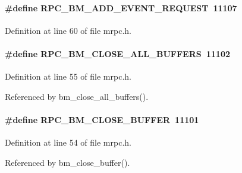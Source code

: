 \paragraph[{RPC\_\-BM\_\-ADD\_\-EVENT\_\-REQUEST}]{\setlength{\rightskip}{0pt plus 5cm}\#define RPC\_\-BM\_\-ADD\_\-EVENT\_\-REQUEST~11107}\hfill\label{group__mrpcdefineh_ga08d9a543a5cb2a44825514fe3d4bcdba}

\begin{DoxyItemize}
\item 
\end{DoxyItemize}

Definition at line 60 of file mrpc.h.
\paragraph[{RPC\_\-BM\_\-CLOSE\_\-ALL\_\-BUFFERS}]{\setlength{\rightskip}{0pt plus 5cm}\#define RPC\_\-BM\_\-CLOSE\_\-ALL\_\-BUFFERS~11102}\hfill\label{group__mrpcdefineh_ga8b215c45660e1188647a692b5bf4f331}

\begin{DoxyItemize}
\item 
\end{DoxyItemize}

Definition at line 55 of file mrpc.h.

Referenced by bm\_\-close\_\-all\_\-buffers().
\paragraph[{RPC\_\-BM\_\-CLOSE\_\-BUFFER}]{\setlength{\rightskip}{0pt plus 5cm}\#define RPC\_\-BM\_\-CLOSE\_\-BUFFER~11101}\hfill\label{group__mrpcdefineh_ga6bcbf5868fd271b48e01dfc56037365a}

\begin{DoxyItemize}
\item 
\end{DoxyItemize}

Definition at line 54 of file mrpc.h.

Referenced by bm\_\-close\_\-buffer().
